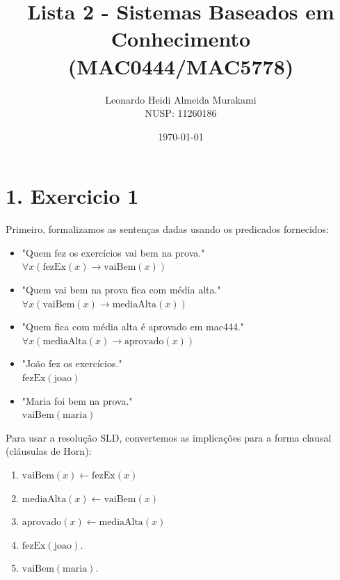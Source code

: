 \documentclass{article}
\title{Lista 2 - Sistemas Baseados em Conhecimento (MAC0444/MAC5778)}
\author{Leonardo Heidi Almeida Murakami \\ NUSP: 11260186}
\date{\today}
\begin{document}
\maketitle

\section*{1. Exercicio 1}

Primeiro, formalizamos as sentenças dadas usando os predicados fornecidos:
\begin{itemize}
\item "Quem fez os exercícios vai bem na prova."  \\
    $\forall x (\text{fezEx}(x) \rightarrow \text{vaiBem}(x))$
\item "Quem vai bem na prova fica com média alta."  \\
    $\forall x (\text{vaiBem}(x) \rightarrow \text{mediaAlta}(x))$
\item "Quem fica com média alta é aprovado em mac444."  \\
    $\forall x (\text{mediaAlta}(x) \rightarrow \text{aprovado}(x))$
\item "João fez os exercícios."  \\
    $\text{fezEx}(\text{joao})$
\item "Maria foi bem na prova."  \\
    $\text{vaiBem}(\text{maria})$
\end{itemize}

Para usar a resolução SLD, convertemos as implicações para a forma clausal (cláusulas de Horn):
\begin{enumerate}
    \item $\text{vaiBem}(x) \leftarrow \text{fezEx}(x)$
    \item $\text{mediaAlta}(x) \leftarrow \text{vaiBem}(x)$
    \item $\text{aprovado}(x) \leftarrow \text{mediaAlta}(x)$
    \item $\text{fezEx}(\text{joao}).$
    \item $\text{vaiBem}(\text{maria}).$
\end{enumerate}
\end{document}
